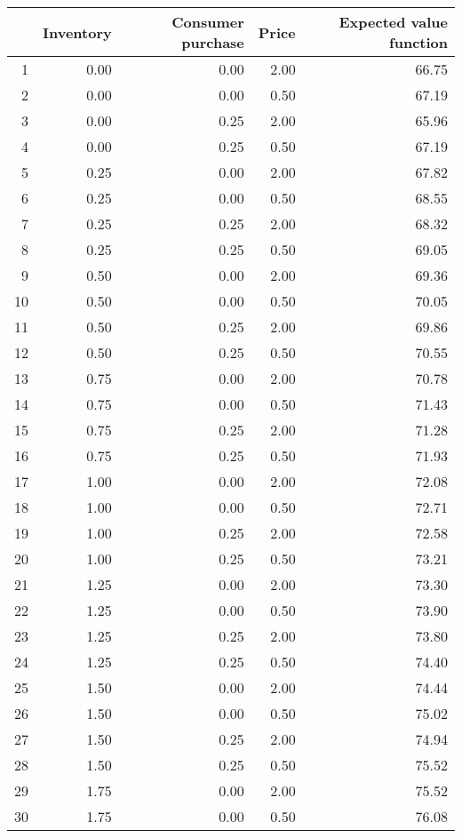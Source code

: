 \begin{tabular}{rrrrr}
  \hline
 & Inventory & Consumer purchase & Price & Expected value function \\ 
  \hline
1 & 0.00 & 0.00 & 2.00 & 66.75 \\ 
  2 & 0.00 & 0.00 & 0.50 & 67.19 \\ 
  3 & 0.00 & 0.25 & 2.00 & 65.96 \\ 
  4 & 0.00 & 0.25 & 0.50 & 67.19 \\ 
  5 & 0.25 & 0.00 & 2.00 & 67.82 \\ 
  6 & 0.25 & 0.00 & 0.50 & 68.55 \\ 
  7 & 0.25 & 0.25 & 2.00 & 68.32 \\ 
  8 & 0.25 & 0.25 & 0.50 & 69.05 \\ 
  9 & 0.50 & 0.00 & 2.00 & 69.36 \\ 
  10 & 0.50 & 0.00 & 0.50 & 70.05 \\ 
  11 & 0.50 & 0.25 & 2.00 & 69.86 \\ 
  12 & 0.50 & 0.25 & 0.50 & 70.55 \\ 
  13 & 0.75 & 0.00 & 2.00 & 70.78 \\ 
  14 & 0.75 & 0.00 & 0.50 & 71.43 \\ 
  15 & 0.75 & 0.25 & 2.00 & 71.28 \\ 
  16 & 0.75 & 0.25 & 0.50 & 71.93 \\ 
  17 & 1.00 & 0.00 & 2.00 & 72.08 \\ 
  18 & 1.00 & 0.00 & 0.50 & 72.71 \\ 
  19 & 1.00 & 0.25 & 2.00 & 72.58 \\ 
  20 & 1.00 & 0.25 & 0.50 & 73.21 \\ 
  21 & 1.25 & 0.00 & 2.00 & 73.30 \\ 
  22 & 1.25 & 0.00 & 0.50 & 73.90 \\ 
  23 & 1.25 & 0.25 & 2.00 & 73.80 \\ 
  24 & 1.25 & 0.25 & 0.50 & 74.40 \\ 
  25 & 1.50 & 0.00 & 2.00 & 74.44 \\ 
  26 & 1.50 & 0.00 & 0.50 & 75.02 \\ 
  27 & 1.50 & 0.25 & 2.00 & 74.94 \\ 
  28 & 1.50 & 0.25 & 0.50 & 75.52 \\ 
  29 & 1.75 & 0.00 & 2.00 & 75.52 \\ 
  30 & 1.75 & 0.00 & 0.50 & 76.08 \\ 

\end{tabular}

